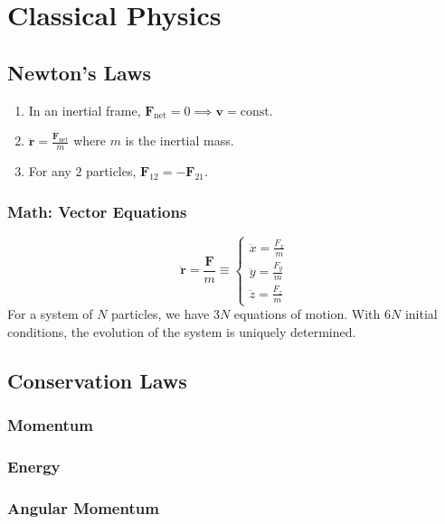 \section{Classical Physics} \label{sec:classical}
\subsection{Newton's Laws} \label{sec:newton}
\begin{enumerate}[label=(\Roman*)]
    \item In an inertial frame, $\bm{F}_{\mathrm{net}} = 0 \implies \bm{v} =
        \mathrm{const}$.
    \item $\ddot{\bm{r}} = \frac{\bm{F}_{\mathrm{net}}}{m}$ where $m$ is the
        inertial mass.
    \item For any $2$ particles, $\bm{F}_{12} = -\bm{F}_{21}$.
\end{enumerate}

\subsubsection{Math: Vector Equations} \label{sec:vector_equations}
\begin{equation*}
    \ddot{\bm{r}} = \frac{\bm{F}}{m} \equiv \begin{cases}
        \ddot{x} = \frac{F_{x}}{m} \\
        \ddot{y} = \frac{F_{y}}{m} \\
        \ddot{z} = \frac{F_{z}}{m}
    \end{cases}
\end{equation*}
For a system of $N$ particles, we have $3N$ equations of motion.
With $6N$ initial conditions, the evolution of the system is uniquely
determined.

\subsection{Conservation Laws} \label{sec:conservation_laws}
\subsubsection{Momentum} \label{sec:conservation:momentum}
\subsubsection{Energy} \label{sec:conservation:energy}
\subsubsection{Angular Momentum} \label{sec:conservation:angular_momentum}

